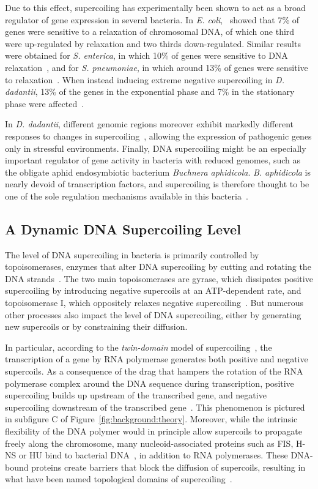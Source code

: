 Due to this effect, supercoiling has experimentally been shown to act as a broad regulator of gene expression in several bacteria.
In \emph{E. coli},~\cite{peter2004} showed that 7\% of genes were sensitive to a relaxation of chromosomal DNA, of which one third were up-regulated by relaxation and two thirds down-regulated.
Similar results were obtained for \emph{S. enterica}, in which 10\% of genes were sensitive to DNA relaxation~\citep{webber2013}, and for \emph{S. pneumoniae}, in which around 13\% of genes were sensitive to relaxation~\citep{ferrandiz2010}.
When instead inducing extreme negative supercoiling in \emph{D. dadantii}, 13\% of the genes in the exponential phase and 7\% in the stationary phase were affected~\citep{pineau2022a}.

In \emph{D. dadantii}, different genomic regions moreover exhibit markedly different responses to changes in supercoiling~\citep{muskhelishvili2019}, allowing the expression of pathogenic genes only in stressful environments.
Finally, DNA supercoiling might be an especially important regulator of gene activity in bacteria with reduced genomes, such as the obligate aphid endosymbiotic bacterium \emph{Buchnera aphidicola}.
\emph{B. aphidicola} is nearly devoid of transcription factors, and supercoiling is therefore thought to be one of the sole regulation mechanisms available in this bacteria~\citep{brinza2013}.

\subsection{A Dynamic DNA Supercoiling Level}

The level of DNA supercoiling in bacteria is primarily controlled by topoisomerases, enzymes that alter DNA supercoiling by cutting and rotating the DNA strands~\citep{duprey2021}.
The two main topoisomerases are gyrase, which dissipates positive supercoiling by introducing negative supercoils at an ATP-dependent rate, and topoisomerase I, which oppositely relaxes negative supercoiling~\citep{martisb.2019}.
But numerous other processes also impact the level of DNA supercoiling, either by generating new supercoils or by constraining their diffusion.

In particular, according to the \emph{twin-domain} model of supercoiling~\citep{liu1987}, the transcription of a gene by RNA polymerase generates both positive and negative supercoils.
As a consequence of the drag that hampers the rotation of the RNA polymerase complex around the DNA sequence during transcription, positive supercoiling builds up upstream of the transcribed gene, and negative supercoiling downstream of the transcribed gene~\citep{visser2022}.
This phenomenon is pictured in subfigure C of Figure~\ref{fig:background:theory}.
Moreover, while the intrinsic flexibility of the DNA polymer would in principle allow supercoils to propagate freely along the chromosome, many nucleoid-associated proteins such as FIS, H-NS or HU bind to bacterial DNA~\citep{krogh2018}, in addition to RNA polymerases.
These DNA-bound proteins create barriers that block the diffusion of supercoils, resulting in what have been named topological domains of supercoiling~\citep{postow2004}.

